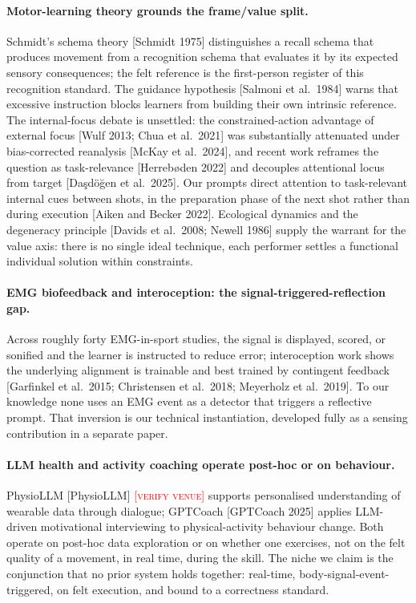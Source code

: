 \documentclass[sigconf]{acmart}
\newcommand{\vf}[1]{\textcolor{red}{[\textsc{#1}]}}
\begin{document}
\paragraph{Motor-learning theory grounds the frame/value split.} Schmidt's schema theory [Schmidt 1975] distinguishes a recall schema that produces movement from a recognition schema that evaluates it by its expected sensory consequences; the felt reference is the first-person register of this recognition standard. The guidance hypothesis [Salmoni et al.\ 1984] warns that excessive instruction blocks learners from building their own intrinsic reference. The internal-focus debate is unsettled: the constrained-action advantage of external focus [Wulf 2013; Chua et al.\ 2021] was substantially attenuated under bias-corrected reanalysis [McKay et al.\ 2024], and recent work reframes the question as task-relevance [Herrebøden 2022] and decouples attentional locus from target [Daşdöğen et al.\ 2025]. Our prompts direct attention to task-relevant internal cues between shots, in the preparation phase of the next shot rather than during execution [Aiken and Becker 2022]. Ecological dynamics and the degeneracy principle [Davids et al.\ 2008; Newell 1986] supply the warrant for the value axis: there is no single ideal technique, each performer settles a functional individual solution within constraints.

\paragraph{EMG biofeedback and interoception: the signal-triggered-reflection gap.} Across roughly forty EMG-in-sport studies, the signal is displayed, scored, or sonified and the learner is instructed to reduce error; interoception work shows the underlying alignment is trainable and best trained by contingent feedback [Garfinkel et al.\ 2015; Christensen et al.\ 2018; Meyerholz et al.\ 2019]. To our knowledge none uses an EMG event as a detector that triggers a reflective prompt. That inversion is our technical instantiation, developed fully as a sensing contribution in a separate paper.

\paragraph{LLM health and activity coaching operate post-hoc or on behaviour.} PhysioLLM [PhysioLLM] \vf{verify venue} supports personalised understanding of wearable data through dialogue; GPTCoach [GPTCoach 2025] applies LLM-driven motivational interviewing to physical-activity behaviour change. Both operate on post-hoc data exploration or on whether one exercises, not on the felt quality of a movement, in real time, during the skill. The niche we claim is the conjunction that no prior system holds together: real-time, body-signal-event-triggered, on felt execution, and bound to a correctness standard.
\end{document}
